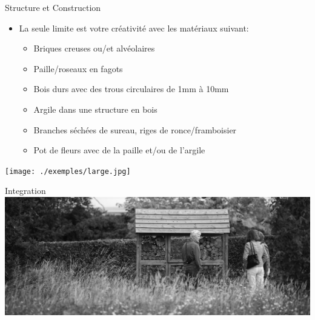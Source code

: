 \documentclass{beamer}
\begin{document}
\begin{frame}{Structure et Construction}
        \begin{itemize}
                \item La seule limite est votre créativité avec les matériaux suivant:
                        \begin{itemize}
                                \item Briques creuses ou/et alvéolaires
                                \item Paille/roseaux en fagots
                                \item Bois durs avec des trous circulaires de 1mm à 10mm
                                \item Argile dans une structure en bois
                                \item Branches séchées de sureau, riges de ronce/framboisier
                                \item Pot de fleurs avec de la paille et/ou de l'argile
                        \end{itemize}
        \end{itemize}
\end{frame}
\begin{frame}
        \texttt{[image: ./exemples/large.jpg]}
\end{frame}
\begin{frame}{Integration}
        \includegraphics[scale=0.05]{./exemples/integration.jpg}
\end{frame}
\end{document}
